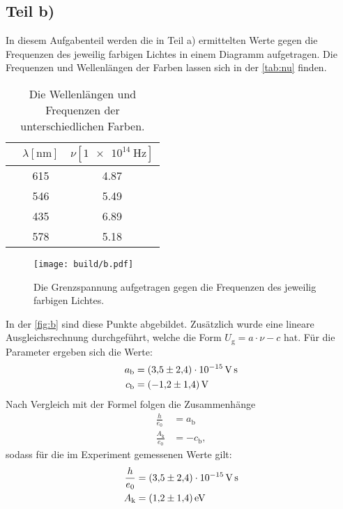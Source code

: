 \subsection{Teil b)}
In diesem Aufgabenteil werden die in Teil a) ermittelten Werte gegen die Frequenzen des jeweilig farbigen Lichtes in einem Diagramm aufgetragen. 
Die Frequenzen und Wellenlängen der Farben lassen sich in der \autoref{tab:nu} finden. 
\begin{table}
  \centering
  \caption{Die Wellenlängen und Frequenzen der unterschiedlichen Farben.}
  \label{tab:nu}
  \begin{tabular}{S[table-format=7] S[table-format=3] S[table-format=1.2]}
    \toprule
    & $\lambda [\si{\nano\metre}]$ & $\nu [\SI{1e14}{\hertz}]$\\
    \midrule
        & 615 & 4.87\\
       & 546 & 5.49\\
     & 435 & 6.89\\
     & 578 & 5.18 \\
    \bottomrule
  \end{tabular}
\end{table}

\begin{figure}[H]
  \centering
  \texttt{[image: build/b.pdf]}
  \caption{Die Grenzspannung aufgetragen gegen die Frequenzen des jeweilig farbigen Lichtes.}
  \label{fig:b}
\end{figure}
\noindent
In der \autoref{fig:b} sind diese Punkte abgebildet. 
Zusätzlich wurde eine lineare Ausgleichsrechnung durchgeführt, welche die Form $U_{\text{g}} = a\cdot \nu - c$ hat.
Für die Parameter ergeben sich die Werte: 
\begin{align*}
  a_{\text{b}} &= \SI{3.5(24)e-15}{\volt\second}\\
  c_{\text{b}} &= \SI{-1.2 \pm 1.4}{\volt}
\end{align*}
Nach Vergleich mit der Formel %
folgen die Zusammenhänge
\begin{align*}
  \frac{h}{e_0} &= a_{\text{b}}\\
  \frac{A_{\text{k}}}{e_0} &= - c_{\text{b}},
\end{align*}
sodass für die im Experiment gemessenen Werte gilt:
\begin{align*}
  \frac{h}{e_0} &= \SI{3.5(24)e-15}{\volt\second}\\
  A_{\text{k}} &= \SI{1.2 \pm 1.4}{\electronvolt}
\end{align*}

